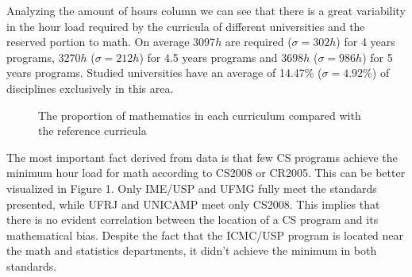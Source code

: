 \documentclass[conference]{IEEEtran}
\begin{document}
	Analyzing the amount of hours column we can see that there is a great variability in the hour load required by the curricula of different universities and the reserved portion to math. On average 3097$h$ are required ($ \sigma = 302h $) for 4 years programs, 3270$h$ ($ \sigma = 212h $) for 4.5 years programs and 3698$h$ ($ \sigma = 986h $) for 5 years programs. Studied universities have an average of 14.47\% ($ \sigma = 4.92\% $) of disciplines exclusively in this area.


\begin{figure}[!t]
\centering
{}
\caption{The proportion of mathematics in each curriculum compared with the reference curricula}
\end{figure}

	The most important fact derived from data is that few CS programs achieve the minimum hour load for math according to CS2008 or CR2005. This can be better visualized in Figure 1. Only IME/USP and UFMG fully meet the standards presented, while UFRJ and UNICAMP meet only CS2008. This implies that there is no evident correlation between the location of a CS program and its mathematical bias. Despite the fact that the ICMC/USP program is located near the math and statistics departments, it didn't achieve the minimum in both standards.
	
\end{document}
